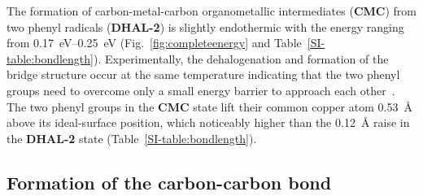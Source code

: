 \documentclass[aps,prb,reprint,amsmath,amssymb]{revtex4-1}
\newcommand{\lock}{\color{red}}
\newcommand{\lock}{\color{black}}
\begin{document}
{\lock

The formation of carbon-metal-carbon organometallic intermediates (\textbf{CMC}) from two phenyl radicals (\textbf{DHAL-2}) is slightly endothermic with the energy ranging from \SIrange{0.17}{0.25}{\electronvolt} (Fig.~\ref{fig:completeenergy} and Table~\ref{SI-table:bondlength}). Experimentally, the dehalogenation and formation of the bridge structure occur at the same temperature indicating that the two phenyl groups need to overcome only a small energy barrier to approach each other~\cite{ullmann_88}. 
%
The two phenyl groups in the \textbf{CMC} state lift their common copper atom \SI{0.53}{\angstrom} above its ideal-surface position, which noticeably higher than the \SI{0.12}{\angstrom} raise in the \textbf{DHAL-2} state (Table~\ref{SI-table:bondlength}).




}

\ifdefined\INTERNAL
\subsection{Formation of the carbon-carbon bond}
\fi
\end{document}
